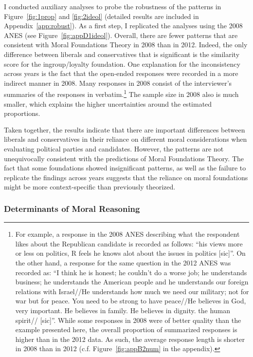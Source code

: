 \documentclass[12pt]{article}
\begin{document}
I conducted auxiliary analyses to probe the robustness of the patterns in Figure~\ref{fig:1prop} and \ref{fig:2ideol} (detailed results are included in Appendix~\ref{app:robust}). As a first step, I replicated the analyses using the 2008 ANES (see Figure~\ref{fig:appD1ideol}). Overall, there are fewer patterns that are consistent with Moral Foundations Theory in 2008 than in 2012. Indeed, the only difference between liberals and conservatives that is significant is the similarity score for the ingroup/loyalty foundation. One explanation for the inconsistency across years is the fact that the open-ended responses were recorded in a more indirect manner in 2008. Many responses in 2008 consist of the interviewer's summaries of the responses in verbatim.\footnote{For example, a response in the 2008 ANES describing what the respondent likes about the Republican candidate is recorded as follows: ``his views more or less on politics, R feels he knows alot about the issues in politics
[sic]''. On the other hand, a response for the same question in the 2012 ANES was recorded as: ``I think he is honest; he couldn't do a worse job; he understands business; he understands the American people and he understands our foreign relations with Israel//He understands how much we need our military; not for war but for peace. You need to be strong to have peace//He believes in God, very important. He believes in family. He believes in dignity. the human spirit// [sic]''. While some responses in 2008 were of better quality than the example presented here, the overall proportion of summarized responses is higher than in the 2012 data. As such, the average response length is shorter in 2008 than in 2012 (c.f. Figure~\ref{fig:appB2num} in the appendix).} The sample size in 2008 also is much smaller, which explains the higher uncertainties around the estimated proportions.

Taken together, the results indicate that there are important differences between liberals and conservatives in their reliance on different moral considerations when evaluating political parties and candidates. However, the patterns are not unequivocally consistent with the predictions of Moral Foundations Theory. The fact that some foundations showed insignificant patterns, as well as the failure to replicate the findings across years suggests that the reliance on moral foundations might be more context-specific than previously theorized.


\subsubsection{Determinants of Moral Reasoning}
\end{document}
